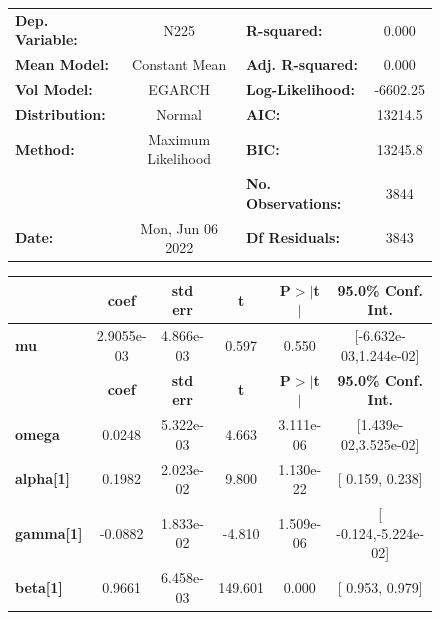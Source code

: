 \documentclass[a4paper, oneside]{discothesis}
\begin{document}
\begin{figure}
\begin{multicols}{2}
{  
\begin{center}
\begin{tabular}{lclc}
\toprule
\textbf{Dep. Variable:} &        N225        & \textbf{  R-squared:         } &     0.000   \\
\textbf{Mean Model:}    &   Constant Mean    & \textbf{  Adj. R-squared:    } &     0.000   \\
\textbf{Vol Model:}     &       EGARCH       & \textbf{  Log-Likelihood:    } &   -6602.25  \\
\textbf{Distribution:}  &       Normal       & \textbf{  AIC:               } &    13214.5  \\
\textbf{Method:}        & Maximum Likelihood & \textbf{  BIC:               } &    13245.8  \\
\textbf{}               &                    & \textbf{  No. Observations:  } &    3844     \\
\textbf{Date:}          &  Mon, Jun 06 2022  & \textbf{  Df Residuals:      } &    3843     \\
\bottomrule
\end{tabular}
\begin{tabular}{lccccc}
            & \textbf{coef} & \textbf{std err} & \textbf{t} & \textbf{P$> |$t$|$} & \textbf{95.0\% Conf. Int.}  \\
\midrule
\textbf{mu} &   2.9055e-03  &    4.866e-03     &     0.597  &          0.550       &   [-6.632e-03,1.244e-02]    \\
                  & \textbf{coef} & \textbf{std err} & \textbf{t} & \textbf{P$> |$t$|$} & \textbf{95.0\% Conf. Int.}  \\
\midrule
\textbf{omega}    &       0.0248  &    5.322e-03     &     4.663  &      3.111e-06       &   [1.439e-02,3.525e-02]     \\
\textbf{alpha[1]} &       0.1982  &    2.023e-02     &     9.800  &      1.130e-22       &     [  0.159,  0.238]       \\
\textbf{gamma[1]} &      -0.0882  &    1.833e-02     &    -4.810  &      1.509e-06       &    [ -0.124,-5.224e-02]     \\
\textbf{beta[1]}  &       0.9661  &    6.458e-03     &   149.601  &        0.000         &     [  0.953,  0.979]       \\
\bottomrule
\end{tabular}
\end{center}

}
\end{multicols}
\end{figure}
\end{document}
